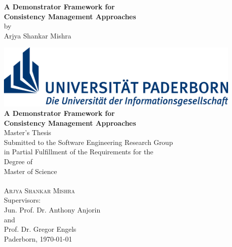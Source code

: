 \documentclass[%
				12pt,
				a4paper,
				oneside,
				titlepage,
				headsepline,
				numbers=noenddot,
				listof=totoc,
				index=totoc,
				bibliography=totoc]{scrartcl}
\theoremstyle{definition}
\begin{document}
    
	
	\setcounter{page}{1}
	{
		\thispagestyle{empty}
		\begin{center}
			{\vspace*{170pt}\Large\textbf{A Demonstrator Framework for\\[5pt] 
					Consistency Management Approaches}}\\[30pt]
			by\\[15pt]
			{\large Arjya Shankar Mishra}
		\end{center}
		\clearpage
		
		\thispagestyle{empty}          
		\begin{center}
				
		\end{center}
		\clearpage
	}  

	\begin{titlepage}
	\thispagestyle{empty}
	\begin{center}

			\includegraphics[width=12cm]{figures/Logo_Uni_Paderborn}\\
                      
      		\vspace{3cm}
			{\LARGE  \textbf{A Demonstrator Framework for\\ [7pt]
					Consistency Management Approaches}} \\ 
			\vspace{0,7cm}
			{\Large Master's Thesis }\\[6pt]
			Submitted to the Software Engineering Research Group\\
			in Partial Fulfillment of the Requirements for the\\
			Degree of\\[6pt]
			{\Large Master of Science}\\
			\vspace{30pt}
			 \\[4pt]
			{\scshape\large Arjya Shankar Mishra}\\	
			\vspace{50pt}
			Supervisors:\\[2pt]
			{\large Jun. Prof. Dr. Anthony Anjorin}\\
			and\\
			{\large Prof. Dr. Gregor Engels}\\
			\vspace{60pt}
			{Paderborn, \today}
					
	\end{center}
	\end{titlepage}
	\clearpage
	
\end{document}
